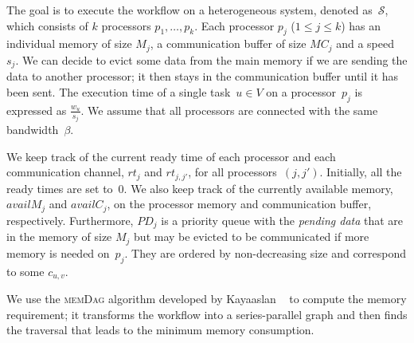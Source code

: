 \documentclass[conference]{IEEEtran}
\newcommand{\algo}[1]{\textsc{#1}}
\newcommand{\cluster}{\,\mathcal{S}}
\newcommand{\MM}{M}
\newcommand{\rt}{rt}
\newcommand{\PD}{PD}
\begin{document}
    The goal is to execute the workflow on a heterogeneous system, denoted as $\cluster$, which
    consists of $k$ processors $p_1, \dots, p_k$.
    Each processor $p_j$ ($1 \leq j \leq k$) has an individual memory of size $M_j$, a communication
    buffer of size $MC_j$ and a speed~$s_j$.
    We can decide to evict some data from the main memory if we are sending the data
    to another processor; it then stays in the communication buffer until it has been sent.
    The execution time of a single task~$u\in V$ on a processor~$p_j$ is expressed as $\frac{w_u}{s_j}$.
    We assume that all processors are connected with the same bandwidth~$\beta$.

    We keep track of the current ready time of each processor and each communication
    channel, $\rt_j$ and $\rt_{j,j'}$, for all processors~$(j,j')$.
    Initially, all the ready times are set to~$0$.
    We also keep track of the currently available memory, $availM_j$ and $availC_j$,
    on the processor memory and communication buffer, respectively.
    Furthermore, $\PD_j$ is a priority queue with the {\em pending data}
    that are in the memory of size $\MM_j$ but may be evicted to be communicated if
    more memory is needed on~$p_j$. They are ordered by non-decreasing size and
    correspond to some $c_{u,v}$.

    We use the \algo{memDag} algorithm developed by Kayaaslan \etal~\cite{KAYAASLAN20181} to compute
    the memory requirement; it transforms the workflow into a series-parallel graph
    and then finds the traversal that leads to the minimum memory consumption.
\end{document}
